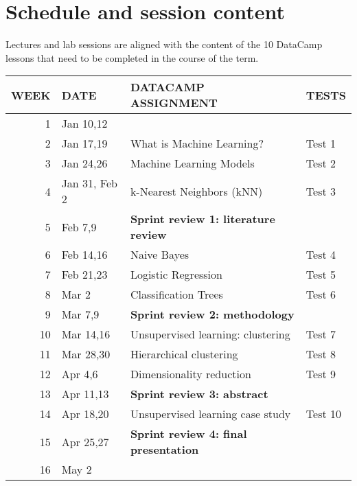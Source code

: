 \documentclass[11pt]{article}
\begin{document}
\section{Schedule and session content}
\label{sec:org0e9b9fe}

Lectures and lab sessions are aligned with the content of the 10
DataCamp lessons that need to be completed in the course of the term.

\begin{center}
\begin{tabular}{rlll}
WEEK & DATE & DATACAMP ASSIGNMENT & TESTS\\
\hline
1 & Jan 10,12 &  & \\
\hline
2 & Jan 17,19 & What is Machine Learning? & Test 1\\
\hline
3 & Jan 24,26 & Machine Learning Models & Test 2\\
\hline
4 & Jan 31, Feb 2 & k-Nearest Neighbors (kNN) & Test 3\\
\hline
5 & Feb 7,9 & \textbf{Sprint review 1: literature review} & \\
\hline
6 & Feb 14,16 & Naive Bayes & Test 4\\
\hline
7 & Feb 21,23 & Logistic Regression & Test 5\\
\hline
8 & Mar 2 & Classification Trees & Test 6\\
\hline
9 & Mar 7,9 & \textbf{Sprint review 2: methodology} & \\
\hline
10 & Mar 14,16 & Unsupervised learning: clustering & Test 7\\
\hline
11 & Mar 28,30 & Hierarchical clustering & Test 8\\
\hline
12 & Apr 4,6 & Dimensionality reduction & Test 9\\
\hline
13 & Apr 11,13 & \textbf{Sprint review 3: abstract} & \\
\hline
14 & Apr 18,20 & Unsupervised learning case study & Test 10\\
\hline
15 & Apr 25,27 & \textbf{Sprint review 4: final presentation} & \\
\hline
16 & May 2 &  & \\
\hline
\end{tabular}
\end{center}
\end{document}
